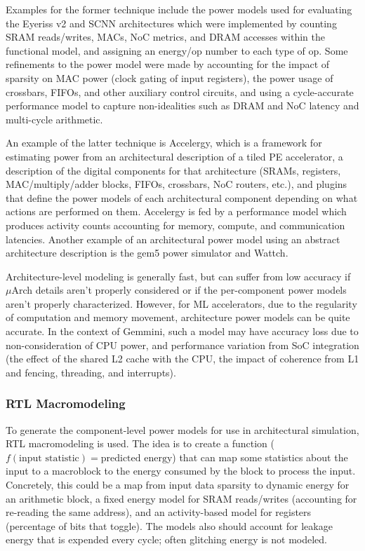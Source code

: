 \documentclass[sigconf]{acmart}
\begin{document}
Examples for the former technique include the power models used for evaluating the Eyeriss v2\cite{eyerissv2} and SCNN\cite{scnn} architectures which were implemented by counting SRAM reads/writes, MACs, NoC metrics, and DRAM accesses within the functional model, and assigning an energy/op number to each type of op.
Some refinements to the power model were made by accounting for the impact of sparsity on MAC power (clock gating of input registers), the power usage of crossbars, FIFOs, and other auxiliary control circuits, and using a cycle-accurate performance model to capture non-idealities such as DRAM and NoC latency and multi-cycle arithmetic.

An example of the latter technique is Accelergy\cite{accelergy}, which is a framework for estimating power from an architectural description of a tiled PE accelerator, a description of the digital components for that architecture (SRAMs, registers, MAC/multiply/adder blocks, FIFOs, crossbars, NoC routers, etc.), and plugins that define the power models of each architectural component depending on what actions are performed on them.
Accelergy is fed by a performance model which produces activity counts accounting for memory, compute, and communication latencies.
Another example of an architectural power model using an abstract architecture description is the gem5 power simulator\cite{gem5power} and Wattch\cite{wattch}.

Architecture-level modeling is generally fast, but can suffer from low accuracy if $\mu$Arch details aren't properly considered or if the per-component power models aren't properly characterized. However, for ML accelerators, due to the regularity of computation and memory movement, architecture power models can be quite accurate. In the context of Gemmini, such a model may have accuracy loss due to non-consideration of CPU power, and performance variation from SoC integration (the effect of the shared L2 cache with the CPU, the impact of coherence from L1 and fencing, threading, and interrupts).

\subsubsection{RTL Macromodeling}
To generate the component-level power models for use in architectural simulation, RTL macromodeling is used.
The idea is to create a function ($f(\text{input statistic}) = \text{predicted energy}$) that can map some statistics about the input to a macroblock to the energy consumed by the block to process the input.
Concretely, this could be a map from input data sparsity to dynamic energy for an arithmetic block, a fixed energy model for SRAM reads/writes (accounting for re-reading the same address), and an activity-based model for registers (percentage of bits that toggle).
The models also should account for leakage energy that is expended every cycle; often glitching energy is not modeled.
\end{document}
